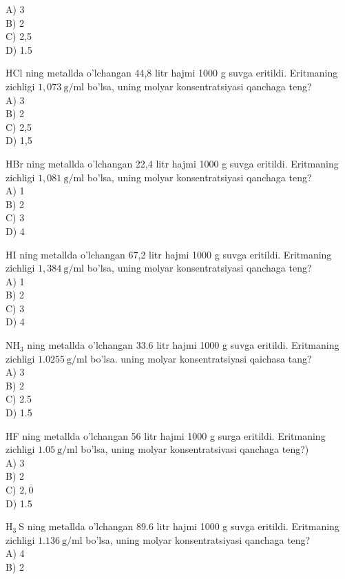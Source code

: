 A) 3\\
B) 2\\
C) 2,5\\
D) 1.5
  \item HCl ning metallda o'lchangan 44,8 litr hajmi 1000 g suvga eritildi. Eritmaning zichligi $1,073 \mathrm{~g} / \mathrm{ml}$ bo'lsa, uning molyar konsentratsiyasi qanchaga teng?\\
A) 3\\
B) 2\\
C) 2,5\\
D) 1,5
  \item HBr ning metallda o'lchangan 22,4 litr hajmi 1000 g suvga eritildi. Eritmaning zichligi $1,081 \mathrm{~g} / \mathrm{ml}$ bo'lsa, uning molyar konsentratsiyasi qanchaga teng?\\
A) 1\\
B) 2\\
C) 3\\
D) 4
  \item HI ning metallda o'lchangan 67,2 litr hajmi 1000 g suvga eritildi. Eritmaning zichligi $1,384 \mathrm{~g} / \mathrm{ml}$ bo'lsa, uning molyar konsentratsiyasi qanchaga teng?\\
A) 1\\
B) 2\\
C) 3\\
D) 4
  \item $\mathrm{NH}_{3}$ ning metallda o'lchangan 33.6 litr hajmi 1000 g suvga eritildi. Eritmaning zichligi $1.0255 \mathrm{~g} / \mathrm{ml}$ bo'lsa. uning molyar konsentratsiyasi qaichasa tang?\\
A) 3\\
B) 2\\
C) 2.5\\
D) 1.5
  \item HF ning metallda o'lchangan 56 litr hajmi 1000 g surga eritildi. Eritmaning zichligi $1.05 \mathrm{~g} / \mathrm{ml}$ bo'lsa, uning molyar konsentratsivasi qanchaga teng?)\\
A) 3\\
B) 2\\
C) $2, \overline{0}$\\
D) 1.5
  \item $\mathrm{H}_{3} \mathrm{~S}$ ning metallda o'lchangan 89.6 litr hajmi 1000 g suvga eritildi. Eritmaning zichligi $1.136 \mathrm{~g} / \mathrm{ml}$ bo'lsa, uning molyar konsentratsiyasi qanchaga teng?\\
A) 4\\
B) 2\\
